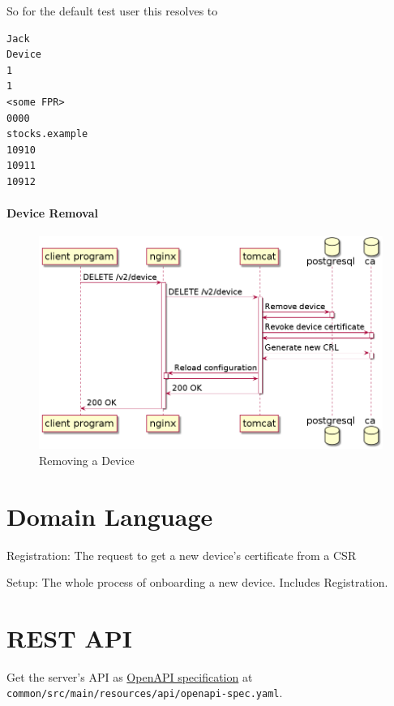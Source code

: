 \documentclass{memoir}
\begin{document}
So for the default test user this resolves to

\begin{lstlisting}
Jack
Device
1
1
<some FPR>
0000
stocks.example
10910
10911
10912
\end{lstlisting}

\paragraph{Device Removal\\}

\begin{figure}[!h]
\includegraphics[width=\linewidth]{diagrams/remove-device.png}
\caption{Removing a Device}
\end{figure}

\section{Domain Language}

Registration: The request to get a new device's certificate from a CSR

Setup: The whole process of onboarding a new device. Includes Registration.

\section{REST API}

Get the server's API as \href{https://spec.openapis.org/oas/latest.html}{OpenAPI specification} at \texttt{common/src/main/resources/api/openapi-spec.yaml}.

\backmatter


\end{document}
